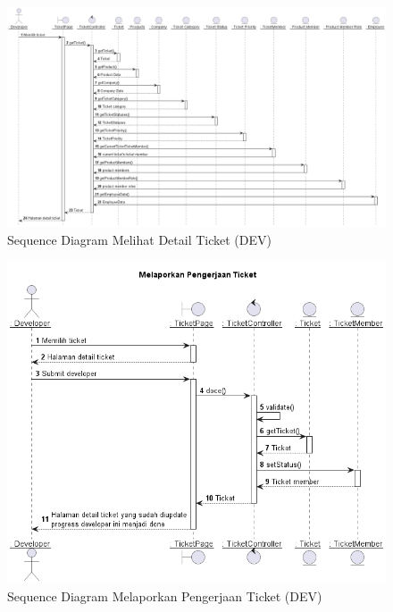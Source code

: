 \documentclass[12pt]{article}
\begin{document}
\begin{enumerate}[label=\textbf{4.\arabic*.}]
\begin{enumerate} [label=\textbf{4.2.\arabic*.}, wide, labelwidth=!, labelindent=0pt]
\begin{enumerate}[label=\textbf{4.2.2.\arabic*.}, wide, labelwidth=!, labelindent=0pt]
\begin{enumerate}[label=\arabic*.]
                \begin{figure}
                    \centering \includegraphics[height=0.575\textheight]{out/plantuml/sequence/idev/idev3/Melihat Detail Ticket.png}
                    \caption{Sequence Diagram Melihat Detail Ticket (DEV)}
                    \label{fig:SQ-DEV-03}
                \end{figure}

                \begin{figure}
                    \centering \includegraphics[height=0.575\textheight]{out/plantuml/sequence/idev/idev4/Melaporkan Pengerjaan Ticket.png}
                    \caption{Sequence Diagram Melaporkan Pengerjaan Ticket (DEV)}
                    \label{fig:SQ-DEV-04}
                \end{figure}
            \end{enumerate}


\end{enumerate}
\end{enumerate}
\end{enumerate}
\end{document}
